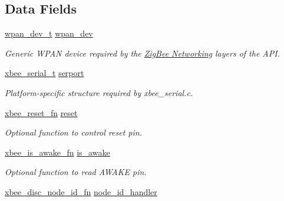 \subsection*{Data Fields}
\begin{DoxyCompactItemize}
\item 
\hypertarget{group__xbee__device_ga8547395da056b57ba7c6b26c0c0f6ccf}{\hyperlink{structwpan__dev__t}{wpan\-\_\-dev\-\_\-t} \hyperlink{group__xbee__device_ga8547395da056b57ba7c6b26c0c0f6ccf}{wpan\-\_\-dev}}\label{group__xbee__device_ga8547395da056b57ba7c6b26c0c0f6ccf}

\begin{DoxyCompactList}\small\item\em Generic W\-P\-A\-N device required by the \hyperlink{group__zigbee}{Zig\-Bee Networking} layers of the A\-P\-I. \end{DoxyCompactList}\item 
\hypertarget{group__xbee__device_ga3145a7888ffabfc3f10e8e85ced0c686}{\hyperlink{structxbee__serial__t}{xbee\-\_\-serial\-\_\-t} \hyperlink{group__xbee__device_ga3145a7888ffabfc3f10e8e85ced0c686}{serport}}\label{group__xbee__device_ga3145a7888ffabfc3f10e8e85ced0c686}

\begin{DoxyCompactList}\small\item\em Platform-\/specific structure required by xbee\-\_\-serial.\-c. \end{DoxyCompactList}\item 
\hypertarget{group__xbee__device_ga1f3cf44cb21be8f101d33062a9d2cf97}{\hyperlink{group__xbee__device_ga7f2f41997c6215582cf3491c984b31ea}{xbee\-\_\-reset\-\_\-fn} \hyperlink{group__xbee__device_ga1f3cf44cb21be8f101d33062a9d2cf97}{reset}}\label{group__xbee__device_ga1f3cf44cb21be8f101d33062a9d2cf97}

\begin{DoxyCompactList}\small\item\em Optional function to control reset pin. \end{DoxyCompactList}\item 
\hypertarget{group__xbee__device_gaf17bb63b8639d0278a2d0ad259865930}{\hyperlink{group__xbee__device_gace56b1c8dd7dc5a23f6fa01878d45b09}{xbee\-\_\-is\-\_\-awake\-\_\-fn} \hyperlink{group__xbee__device_gaf17bb63b8639d0278a2d0ad259865930}{is\-\_\-awake}}\label{group__xbee__device_gaf17bb63b8639d0278a2d0ad259865930}

\begin{DoxyCompactList}\small\item\em Optional function to read A\-W\-A\-K\-E pin. \end{DoxyCompactList}\item 
\hypertarget{group__xbee__device_ga4952189ed8b46b133b5298b4fce75ab8}{\hyperlink{group__xbee__device_ga55de36532265a72bffa969d5353800d7}{xbee\-\_\-disc\-\_\-node\-\_\-id\-\_\-fn} \hyperlink{group__xbee__device_ga4952189ed8b46b133b5298b4fce75ab8}{node\-\_\-id\-\_\-handler}}\label{group__xbee__device_ga4952189ed8b46b133b5298b4fce75ab8}


\end{DoxyCompactItemize}
